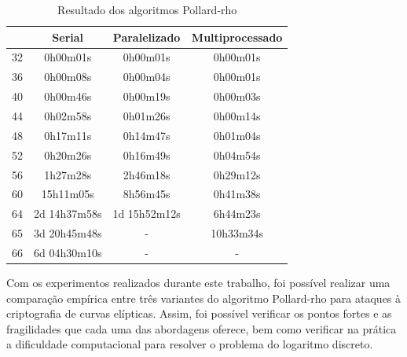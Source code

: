 \begin{table}[h]
\centering
\label{table:results}
\begin{tabular}{|l|c|c|c|}
\hline
\rowcolor[gray]{0.9}
\multicolumn{1}{|c|}{\(bits\)} & \textbf{Serial} & \textbf{Paralelizado} & \textbf{Multiprocessado} \\ \hline
32                             & 0h00m01s        & 0h00m01s              & 0h00m01s                 \\ \hline
36                             & 0h00m08s        & 0h00m04s              & 0h00m01s                 \\ \hline
40                             & 0h00m46s        & 0h00m19s              & 0h00m03s                 \\ \hline
44                             & 0h02m58s        & 0h01m26s              & 0h00m14s                 \\ \hline
48                             & 0h17m11s        & 0h14m47s              & 0h01m04s                 \\ \hline
52                             & 0h20m26s        & 0h16m49s              & 0h04m54s                 \\ \hline
56                             & 1h27m28s        & 2h46m18s              & 0h29m12s                 \\ \hline
60                             & 15h11m05s       & 8h56m45s              & 0h41m38s                 \\ \hline
64                             & 2d 14h37m58s    & 1d 15h52m12s          & 6h44m23s                 \\ \hline
65                             & 3d 20h45m48s    & -                     & 10h33m34s                \\ \hline
66                             & 6d 04h30m10s    & -                     & -                        \\ \hline
\end{tabular}
\caption{Resultado dos algoritmos Pollard-rho}
\end{table}

Com os experimentos realizados durante este trabalho, foi possível realizar uma comparação empírica entre três variantes do algoritmo Pollard-rho para ataques à criptografia de curvas elípticas. Assim, foi possível verificar os pontos fortes e as fragilidades que cada uma das abordagens oferece, bem como verificar na prática a dificuldade computacional para resolver o problema do logaritmo discreto.

